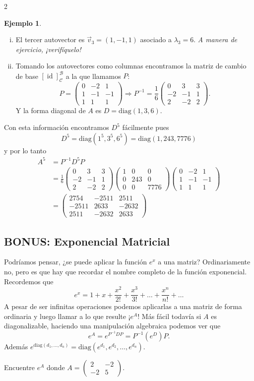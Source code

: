 \documentclass[12pt]{article}
\theoremstyle{plain}
\theoremstyle{definition}
\newtheorem{Ex}[Th]{Ejemplo}           %
\theoremstyle{remark}
\DeclareMathOperator{\id}{id}       %
\newcommand{\la}{\lambda}           %
\newcommand{\cB}{\mathcal{B}}       %
\newcommand{\cC}{\mathcal{C}}       %
\renewcommand{\:}{\colon}           %
\renewcommand{\.}{\Cdot}                %
\newcommand{\twobytwo}[4]{\begin{pmatrix} %
    #1 & #2 \\ #3 & #4 \end{pmatrix}}
\newcommand{\threebythree}[9]{\begin{pmatrix} %
  #1 & #2 & #3 \\ #4 & #5 & #6 \\ #7 & #8 & #9 \end{pmatrix}}
\newcommand{\To}{\Rightarrow}
\begin{document}
\begin{multicols}{2}
\begin{Ex}
\begin{enumerate}[i)]
$$  \right.
  $$
  y así obtenemos la solución $(-2z,-z,z)$. El autovector $\vec{v}_2=(-2,-1,1)$ está asociado entonces a $\la_2$.
  \item El tercer autovector es $\vec{v}_3=(1,-1,1)$ asociado a $\la_3=6$. \emph{A manera de ejercicio, ¡verifíquelo!}
  \item Tomando los autovectores como columnas encontramos la matriz de cambio de base $[\id]^\cB_\cC$ a la que llamamos $P$:
  $$P=\threebythree{0}{-2}{1}{1}{-1}{-1}{1}{1}{1}\To P^{-1}=\frac16\threebythree{0}{3}{3}{-2}{-1}{1}{2}{-2}{2}.$$ 
  Y la forma diagonal de $A$ es $D=\text{diag}(1,3,6)$.
\end{enumerate}
Con esta información encontramos $D^5$ fácilmente pues
$$D^5=\text{diag}(1^5,3^5,6^5)=\text{diag}(1,243,7776)$$
y por lo tanto 
\begin{align*}
  A^5&=P^{-1}D^5P\\
  &=\frac16\threebythree{0}{3}{3}{-2}{-1}{1}{2}{-2}{2}\threebythree{1}{0}{0}{0}{243}{0}{0}{0}{7776}\threebythree{0}{-2}{1}{1}{-1}{-1}{1}{1}{1}\\
  &=\threebythree{2754}{-2511}{2511}{-2511}{2633}{-2632}{2511}{-2632}{2633}
\end{align*}
\end{Ex}

\subsection*{BONUS: Exponencial Matricial}

Podríamos pensar, ¿se puede aplicar la función $e^x$ a una matriz? Ordinariamente no, pero es que hay que recordar el nombre completo de la función exponencial. Recordemos que 
$$e^x=1+x+\frac{x^2}{2!}+\frac{x^3}{3!}+\dots+\frac{x^n}{n!}+\dots$$
A pesar de ser infinitas operaciones podemos aplicarlas a una matriz de forma ordinaria y luego llamar a lo que resulte ¡$e^A$! Más fácil todavía si $A$ es diagonalizable, haciendo una manipulación algebraica podemos ver que 
$$e^A=e^{P^{-1}DP}=P^{-1}(e^D)P.$$
Además $e^{\text{diag}(d_1,\dots,d_n)}=\text{diag}(e^{d_1},e^{d_2},\dots,e^{d_n})$. 

\begin{ptcbP}
  Encuentre $e^A$ donde $A=\twobytwo{2}{-2}{-2}{5}$.
\end{ptcbP}

\end{multicols}
\end{document}
